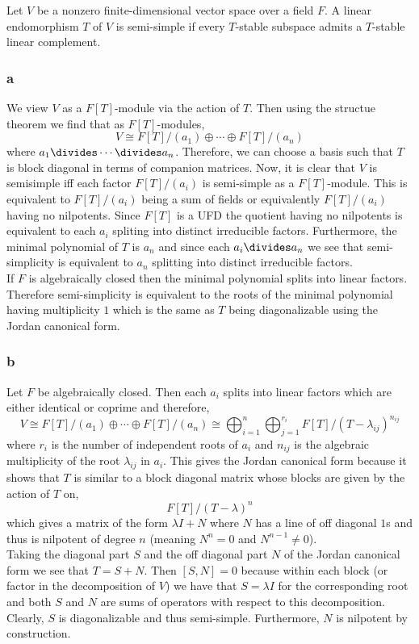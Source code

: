 \documentclass[12pt]{article}
\begin{document}
Let $V$ be a nonzero finite-dimensional vector space over a field $F$. A linear endomorphism $T$ of $V$ is semi-simple if every $T$-stable subspace admits a $T$-stable linear complement.


\subsubsection{a}

We view $V$ as a $F[T]$-module via the action of $T$. Then using the structue theorem we find that as $F[T]$-modules,
\[ V \cong F[T]/(a_1) \oplus \cdots \oplus F[T]/(a_n) \]
where $a_1 \divides \cdots \divides a_n$. Therefore, we can choose a basis such that $T$ is block diagonal in terms of companion matrices. Now, it is clear that $V$ is semisimple iff each factor $F[T]/(a_i)$ is semi-simple as a $F[T]$-module. This is equivalent to $F[T]/(a_i)$ being a sum of fields or equivalently $F[T]/(a_i)$ having no nilpotents. Since $F[T]$ is a UFD the quotient having no nilpotents is equivalent to each $a_i$ spliting into distinct irreducible factors. Furthermore, the minimal polynomial of $T$ is $a_n$ and since each $a_i \divides a_n$ we see that semi-simplicity is equivalent to $a_n$ splitting into distinct irreducible factors.
\bigskip\\
If $F$ is algebraically closed then the minimal polynomial splits into linear factors. Therefore semi-simplicity is equivalent to the roots of the minimal polynomial having multiplicity $1$ which is the same as $T$ being diagonalizable using the Jordan canonical form.

\subsubsection{b}

Let $F$ be algebraically closed. Then each $a_i$ splits into linear factors which are either identical or coprime and therefore,
\[ V \cong F[T]/(a_1) \oplus \cdots \oplus F[T]/(a_n) \cong \bigoplus_{i = 1}^n \bigoplus_{j = 1}^{r_i} F[T]/(T - \lambda_{ij})^{n_{ij}} \]
where $r_i$ is the number of independent roots of $a_i$ and $n_{ij}$ is the algebraic multiplicity of the root $\lambda_{ij}$ in $a_i$. This gives the Jordan canonical form because it shows that $T$ is similar to a block diagonal matrix whose blocks are given by the action of $T$ on,
\[ F[T]/(T - \lambda)^n \]
which gives a matrix of the form $\lambda I + N$ where $N$ has a line of off diagonal $1$s and thus is nilpotent of degree $n$ (meaning $N^n = 0$ and $N^{n-1} \neq 0$).
\bigskip\\
Taking the diagonal part $S$ and the off diagonal part $N$ of the Jordan canonical form we see that $T = S + N$. Then $[S, N] = 0$ because within each block (or factor in the decomposition of $V$) we have that $S = \lambda I$ for the corresponding root and both $S$ and $N$ are sums of operators with respect to this decomposition. Clearly, $S$ is diagonalizable and thus semi-simple. Furthermore, $N$ is nilpotent by construction.
\end{document}
